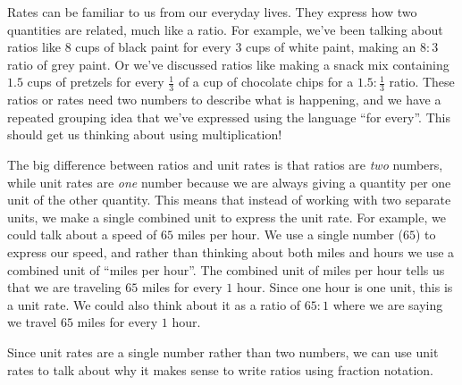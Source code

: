 \documentclass{ximera}
\begin{document}
Rates can be familiar to us from our everyday lives. They express how two quantities are related, much like a ratio. For example, we've been talking about ratios like $8$ cups of black paint for every $3$ cups of white paint, making an $8:3$ ratio of grey paint. Or we've discussed ratios like making a snack mix containing $1.5$ cups of pretzels for every $\frac{1}{3}$ of a cup of chocolate chips for a $1.5:\frac{1}{3}$ ratio. These ratios or rates need two numbers to describe what is happening, and we have a repeated grouping idea that we've expressed using the language ``for every''. This should get us thinking about using multiplication! 

The big difference between ratios and unit rates is that ratios are \emph{two} numbers, while unit rates are \emph{one} number because we are always giving a quantity per one unit of the other quantity. This means that instead of working with two separate units, we make a single combined unit to express the unit rate. For example, we could talk about a speed of $65$ miles per hour. We use a single number ($65$) to express our speed, and rather than thinking about both miles and hours we use a combined unit of ``miles per hour''.  The combined unit of miles per hour tells us that we are traveling $65$ miles for every $1$ hour. Since one hour is one unit, this is a unit rate. We could also think about it as a ratio of $65:1$ where we are saying we travel $65$ miles for every $1$ hour. 

Since unit rates are a single number rather than two numbers, we can use unit rates to talk about why it makes sense to write ratios using fraction notation.
\end{document}
